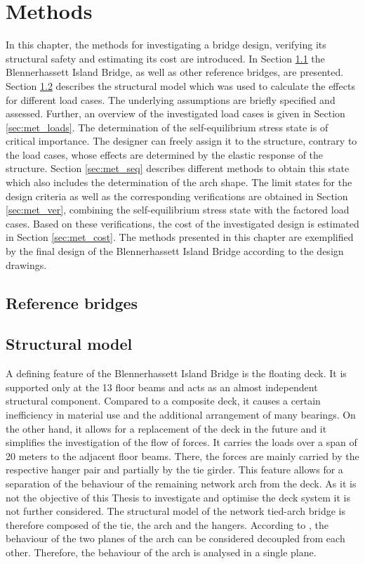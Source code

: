 \section{Methods}\label{sec:methods}
In this chapter, the methods for investigating a bridge design, verifying its structural safety and estimating its cost are introduced. In Section \ref{sec:met_ref} the Blennerhassett Island Bridge, as well as other reference bridges, are presented.
Section \ref{sec:met_str} describes the structural model which was used to calculate the effects for different load cases. The underlying assumptions are briefly specified and assessed. Further, an overview of the investigated load cases is given in Section \ref{sec:met_loads}. The determination of the self-equilibrium stress state is of critical importance. The designer can freely assign it to the structure, contrary to the load cases, whose effects are determined by the elastic response of the structure. Section \ref{sec:met_seq} describes different methods to obtain this state which also includes the determination of the arch shape. The limit states for the design criteria as well as the corresponding verifications are obtained in Section \ref{sec:met_ver}, combining the self-equilibrium stress state with the factored load cases. Based on these verifications, the cost of the investigated design is estimated in Section \ref{sec:met_cost}. The methods presented in this chapter are exemplified by the final design of the Blennerhassett Island Bridge according to the design drawings.

\subsection{Reference bridges} \label{sec:met_ref}

\newpage
\subsection{Structural model} \label{sec:met_str}
A defining feature of the Blennerhassett Island Bridge is the floating deck. It is supported only at the 13 floor beams and acts as an almost independent structural component. Compared to a composite deck, it causes a certain inefficiency in material use and the additional arrangement of many bearings. On the other hand, it allows for a replacement of the deck in the future and it simplifies the investigation of the flow of forces. It carries the loads over a span of 20 meters to the adjacent floor beams. There, the forces are mainly carried by the respective hanger pair and partially by the tie girder. This feature allows for a separation of the behaviour of the remaining network arch from the deck. As it is not the objective of this Thesis to investigate and optimise the deck system it is not further considered. The structural model of the network tied-arch bridge is therefore composed of the tie, the arch and the hangers. According to \citep{Smit}, the behaviour of the two planes of the arch can be considered decoupled from each other. Therefore, the behaviour of the arch is analysed in a single plane.\bigskip

